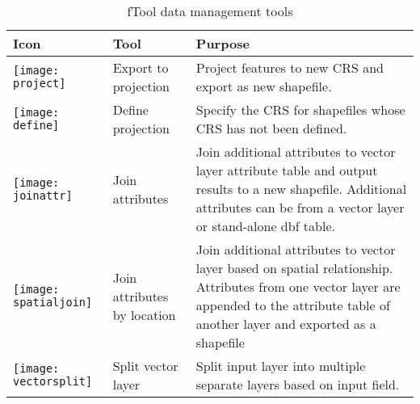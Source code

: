 \begin{table}[ht]
\centering
\caption{fTool data management tools}\label{tab:fTool_data_management}\medskip
 \begin{tabular}{|p{0.3in}|p{1.3in}|p{4.6in}|}
 \hline \textbf{Icon} & \textbf{Tool} & \textbf{Purpose} \\
 \hline \texttt{[image: project]} & Export to projection & 
Project features to new CRS and export as new shapefile. \\
 \hline \texttt{[image: define]} & Define projection & 
Specify the CRS for shapefiles whose CRS has not been defined. \\
 \hline \texttt{[image: joinattr]} & Join attributes & Join 
additional attributes to vector layer attribute table and output results 
to a new shapefile. Additional attributes can be from a vector layer or 
stand-alone dbf table. \\
 \hline \texttt{[image: spatialjoin]} & Join attributes by 
location & Join additional attributes to vector layer based on spatial 
relationship. Attributes from one vector layer are appended to the attribute 
table of another layer and exported as a shapefile \\
 \hline \texttt{[image: vectorsplit]} & Split vector layer & 
Split input layer into multiple separate layers based on input field. \\
 \hline
\end{tabular}
\end{table}




